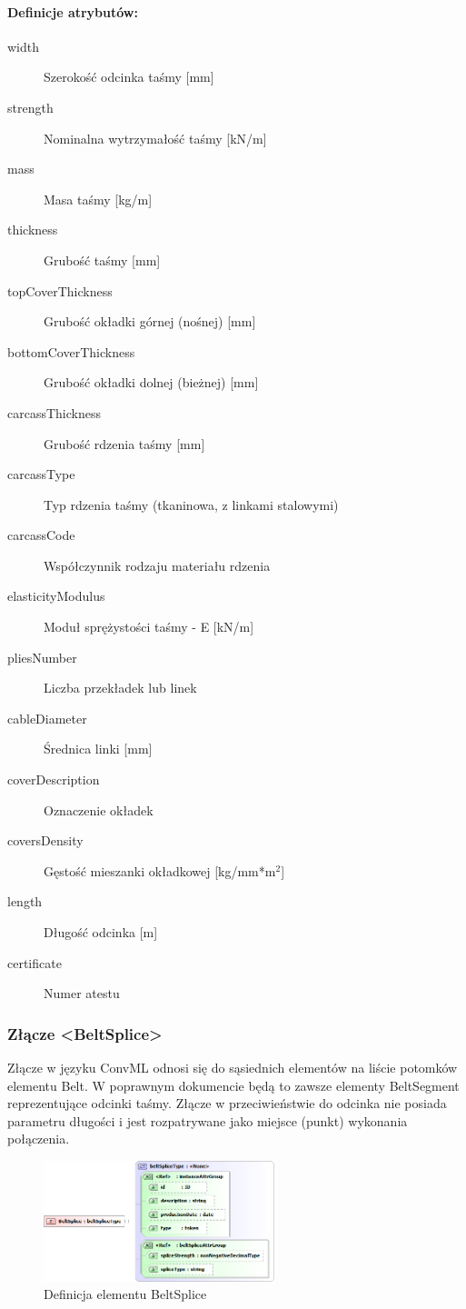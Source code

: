 \documentclass[12pt,a4paper]{article}
\begin{document}
\paragraph{Definicje atrybutów:}
\begin{description}
\item[width] Szerokość odcinka taśmy [mm]
\item[strength] Nominalna wytrzymałość taśmy [kN/m]
\item[mass] Masa taśmy [kg/m]
\item[thickness] Grubość taśmy [mm]
\item[topCoverThickness] Grubość okładki górnej (nośnej) [mm]
\item[bottomCoverThickness] Grubość okładki dolnej (bieżnej) [mm]
\item[carcassThickness] Grubość rdzenia taśmy [mm]
\item[carcassType] Typ rdzenia taśmy (tkaninowa, z linkami stalowymi)
\item[carcassCode] Współczynnik rodzaju materiału rdzenia
\item[elasticityModulus] Moduł sprężystości taśmy - E [kN/m]
\item[pliesNumber] Liczba przekładek lub linek
\item[cableDiameter] Średnica linki [mm]
\item[coverDescription] Oznaczenie okładek
\item[coversDensity] Gęstość mieszanki okładkowej [kg/mm*m$^2$]
\item[length] Długość odcinka [m]
\item[certificate] Numer atestu
\end{description}

\subsubsection{Złącze <BeltSplice>}
Złącze w języku ConvML odnosi się do sąsiednich elementów na liście potomków
elementu Belt. W poprawnym dokumencie będą to zawsze elementy BeltSegment
reprezentujące odcinki taśmy. Złącze w przeciwieństwie do odcinka nie posiada
parametru długości i jest rozpatrywane jako miejsce (punkt) wykonania
połączenia.

\begin{figure}[h]
  \centering
  \includegraphics[width=0.6\textwidth]{png/belt_splice_xsd2}
  \caption{Definicja elementu BeltSplice}
  \label{fig:belt-splice-xsd}
\end{figure}
\end{document}
